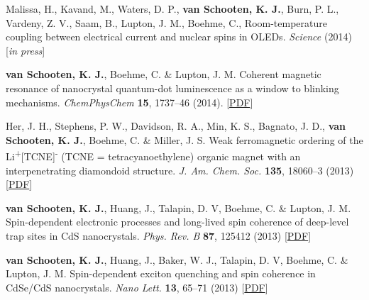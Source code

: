 \documentclass[11pt,letterpaper]{article}
\newcommand{\mhead}[1]{\leavevmode\marginpar{\sffamily\small #1}}
\begin{document}
\bigskip
\mhead{Refereed\newline Journal\newline Publications}
\vspace{-1.0em} %
\begin{bibenum}

		\item Malissa, H., Kavand, M., Waters, D. P., \textbf{van Schooten, K. J.}, Burn, P. L., Vardeny, Z. V., Saam, B., Lupton, J. M., Boehme, C., Room-temperature coupling between electrical current and nuclear spins in OLEDs. \textit{Science} (2014) [\textit{in press}]

		\item \textbf{van Schooten, K. J.}, Boehme, C. \& Lupton, J. M. Coherent magnetic resonance of nanocrystal quantum-dot luminescence as a window to blinking mechanisms. \textit{ChemPhysChem} \textbf{15}, 1737--46 (2014).  [\href{http://www.physics.utah.edu/~kippvs/papers/2014_ChemPhysChem.pdf}{PDF}]

		\item Her, J. H., Stephens, P. W., Davidson, R. A., Min, K. S., Bagnato, J. D., \textbf{van Schooten, K. J.}, Boehme, C. \& Miller, J. S.	Weak ferromagnetic ordering of the Li\textsuperscript{+}[TCNE]\textsuperscript{\textbullet -} (TCNE = tetracyanoethylene) organic magnet with an interpenetrating diamondoid structure. \textit{J. Am. Chem. Soc.} \textbf{135}, 18060--3 (2013)  [\href{http://www.physics.utah.edu/~kippvs/papers/2013_JACS.pdf}{PDF}]
		
		\item \textbf{van Schooten, K. J.}, Huang, J., Talapin, D. V, Boehme, C. \& Lupton, J. M. Spin-dependent electronic processes and long-lived spin coherence of deep-level trap sites in CdS nanocrystals. \textit{Phys. Rev. B} \textbf{87}, 125412 (2013)  [\href{http://www.physics.utah.edu/~kippvs/papers/2013_PRB.pdf}{PDF}]
		
		\item \textbf{van Schooten, K. J.}, Huang, J., Baker, W. J., Talapin, D. V, Boehme, C. \& Lupton, J. M. Spin-dependent exciton quenching and spin coherence in CdSe/CdS nanocrystals. \textit{Nano Lett.} \textbf{13}, 65--71 (2013)  [\href{http://www.physics.utah.edu/~kippvs/papers/2013_NanoLett.pdf}{PDF}]


\end{bibenum}
\end{document}
